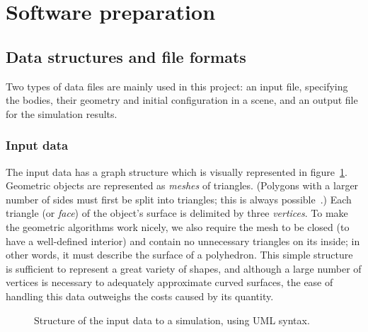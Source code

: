 \section{Software preparation\label{softwarePreparation}}

\subsection{Data structures and file formats}
Two types of data files are mainly used in this project: an input file, specifying the bodies,
their geometry and initial configuration in a scene, and an output file for the simulation
results.

\subsubsection{Input data}
The input data has a graph structure which is visually represented in figure~\ref{sceneSchema}.
Geometric objects are represented as \emph{meshes} of triangles. (Polygons with a larger number of
sides must first be split into triangles; this is always possible~\cite{Skiena:98}.) Each triangle
(or \emph{face}) of the object's surface is delimited by three \emph{vertices}. To make the
geometric algorithms work nicely, we also require the mesh to be closed (to have a well-defined
interior) and contain no unnecessary triangles on its inside; in other words, it must describe the
surface of a polyhedron. This simple structure is sufficient to represent a great variety of
shapes, and although a large number of vertices is necessary to adequately approximate curved
surfaces, the ease of handling this data outweighs the costs caused by its quantity.

\begin{figure}
\centerline{}
\caption{Structure of the input data to a simulation, using UML syntax.\label{sceneSchema}}
\end{figure}

